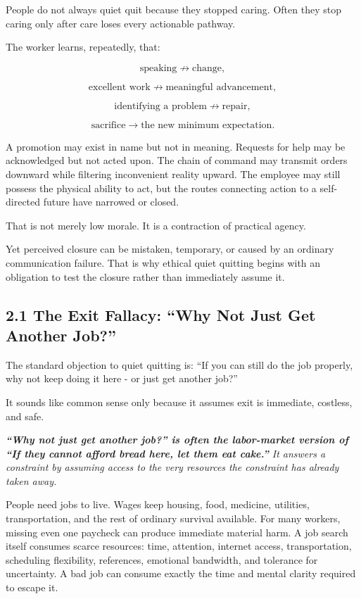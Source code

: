 \documentclass[11pt,oneside]{article}
\renewenvironment{quote}
  {\begin{tcolorbox}[
      enhanced,
      breakable,
      colback=ManifestLight,
      colframe=ManifestRule,
      boxrule=0pt,
      leftrule=3pt,
      arc=0pt,
      outer arc=0pt,
      left=10pt,right=10pt,top=8pt,bottom=8pt,
      before skip=0.8em,after skip=0.8em
    ]\itshape}
  {\end{tcolorbox}}
\begin{document}
People do not always quiet quit because they stopped caring. Often they
stop caring only after care loses every actionable pathway.

The worker learns, repeatedly, that:

\[
\text{speaking} \nrightarrow \text{change},
\]

\[
\text{excellent work} \nrightarrow \text{meaningful advancement},
\]

\[
\text{identifying a problem} \nrightarrow \text{repair},
\]

\[
\text{sacrifice} \rightarrow \text{the new minimum expectation}.
\]

A promotion may exist in name but not in meaning. Requests for help may
be acknowledged but not acted upon. The chain of command may transmit
orders downward while filtering inconvenient reality upward. The
employee may still possess the physical ability to act, but the routes
connecting action to a self-directed future have narrowed or closed.

That is not merely low morale. It is a contraction of practical agency.

Yet perceived closure can be mistaken, temporary, or caused by an
ordinary communication failure. That is why ethical quiet quitting
begins with an obligation to test the closure rather than immediately
assume it.


\subsection{2.1 The Exit Fallacy: ``Why Not Just Get Another
Job?''}\label{the-exit-fallacy-why-not-just-get-another-job}

The standard objection to quiet quitting is: ``If you can still do the
job properly, why not keep doing it here - or just get another job?''

It sounds like common sense only because it assumes exit is immediate,
costless, and safe.

\begin{quote}
\textbf{``Why not just get another job?'' is often the labor-market
version of ``If they cannot afford bread here, let them eat cake.''} It
answers a constraint by assuming access to the very resources the
constraint has already taken away.
\end{quote}

People need jobs to live. Wages keep housing, food, medicine, utilities,
transportation, and the rest of ordinary survival available. For many
workers, missing even one paycheck can produce immediate material harm.
A job search itself consumes scarce resources: time, attention, internet
access, transportation, scheduling flexibility, references, emotional
bandwidth, and tolerance for uncertainty. A bad job can consume exactly
the time and mental clarity required to escape it.
\end{document}
